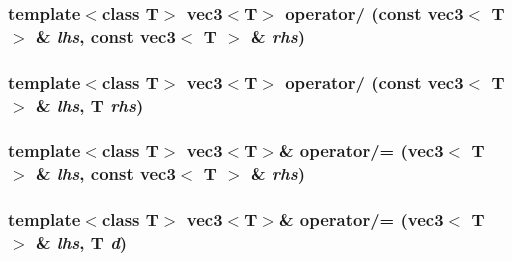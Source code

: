 \hypertarget{classnv_1_1vec3_81ffa1ef5723fd3e1592fe13eaa79728}{
\subsubsection[{operator/}]{\setlength{\rightskip}{0pt plus 5cm}template$<$class T$>$ {\bf vec3}$<$T$>$ operator/ (const {\bf vec3}$<$ T $>$ \& {\em lhs}, \/  const {\bf vec3}$<$ T $>$ \& {\em rhs})}}
\label{classnv_1_1vec3_81ffa1ef5723fd3e1592fe13eaa79728}


\hypertarget{classnv_1_1vec3_7871a19554011d56a1e97822e1eaf340}{
\subsubsection[{operator/}]{\setlength{\rightskip}{0pt plus 5cm}template$<$class T$>$ {\bf vec3}$<$T$>$ operator/ (const {\bf vec3}$<$ T $>$ \& {\em lhs}, \/  T {\em rhs})}}
\label{classnv_1_1vec3_7871a19554011d56a1e97822e1eaf340}


\hypertarget{classnv_1_1vec3_8c22ebf703a1c1fe718cf72023ca948c}{
\subsubsection[{operator/=}]{\setlength{\rightskip}{0pt plus 5cm}template$<$class T$>$ {\bf vec3}$<$T$>$\& operator/= ({\bf vec3}$<$ T $>$ \& {\em lhs}, \/  const {\bf vec3}$<$ T $>$ \& {\em rhs})}}
\label{classnv_1_1vec3_8c22ebf703a1c1fe718cf72023ca948c}


\hypertarget{classnv_1_1vec3_844bafa4fa80f32b5a32ab17950f5485}{
\subsubsection[{operator/=}]{\setlength{\rightskip}{0pt plus 5cm}template$<$class T$>$ {\bf vec3}$<$T$>$\& operator/= ({\bf vec3}$<$ T $>$ \& {\em lhs}, \/  T {\em d})}}
\label{classnv_1_1vec3_844bafa4fa80f32b5a32ab17950f5485}


